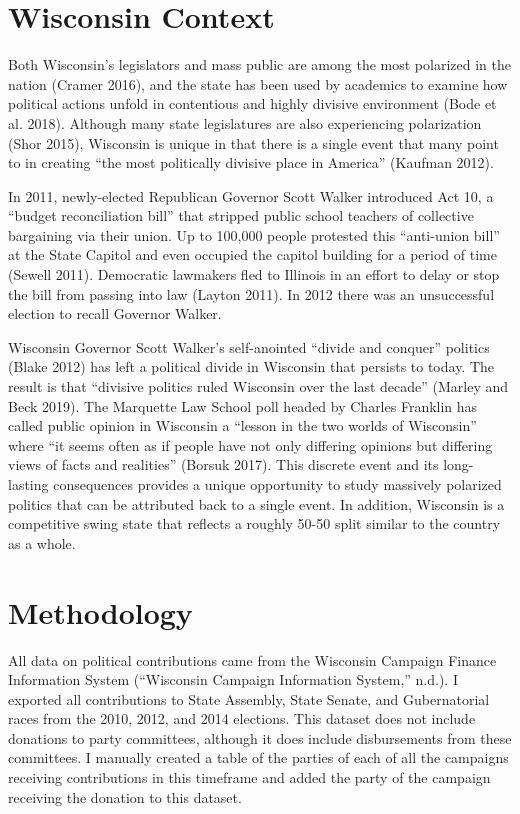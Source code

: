 \documentclass[12pt,]{article}
\begin{document}
\hypertarget{wisconsin-context}{%
\section{Wisconsin Context}\label{wisconsin-context}}

Both Wisconsin's legislators and mass public are among the most
polarized in the nation (Cramer 2016), and the state has been used by
academics to examine how political actions unfold in contentious and
highly divisive environment (Bode et al. 2018). Although many state
legislatures are also experiencing polarization (Shor 2015), Wisconsin
is unique in that there is a single event that many point to in creating
``the most politically divisive place in America'' (Kaufman 2012).

In 2011, newly-elected Republican Governor Scott Walker introduced Act
10, a ``budget reconciliation bill'' that stripped public school
teachers of collective bargaining via their union. Up to 100,000 people
protested this ``anti-union bill'' at the State Capitol and even
occupied the capitol building for a period of time (Sewell 2011).
Democratic lawmakers fled to Illinois in an effort to delay or stop the
bill from passing into law (Layton 2011). In 2012 there was an
unsuccessful election to recall Governor Walker.

Wisconsin Governor Scott Walker's self-anointed ``divide and conquer''
politics (Blake 2012) has left a political divide in Wisconsin that
persists to today. The result is that ``divisive politics ruled
Wisconsin over the last decade'' (Marley and Beck 2019). The Marquette
Law School poll headed by Charles Franklin has called public opinion in
Wisconsin a ``lesson in the two worlds of Wisconsin'' where ``it seems
often as if people have not only differing opinions but differing views
of facts and realities'' (Borsuk 2017). This discrete event and its
long-lasting consequences provides a unique opportunity to study
massively polarized politics that can be attributed back to a single
event. In addition, Wisconsin is a competitive swing state that reflects
a roughly 50-50 split similar to the country as a whole.

\hypertarget{methodology}{%
\section{Methodology}\label{methodology}}

All data on political contributions came from the Wisconsin Campaign
Finance Information System (``Wisconsin Campaign Information System,''
n.d.). I exported all contributions to State Assembly, State Senate, and
Gubernatorial races from the 2010, 2012, and 2014 elections. This
dataset does not include donations to party committees, although it does
include disbursements from these committees. I manually created a table
of the parties of each of all the campaigns receiving contributions in
this timeframe and added the party of the campaign receiving the
donation to this dataset.
\end{document}
